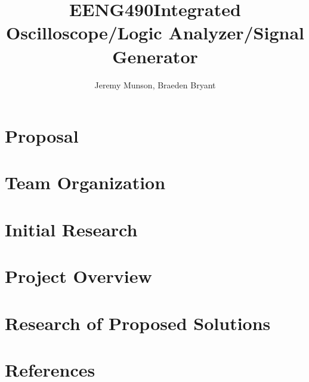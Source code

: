 \documentclass[11pt]{article}
\title{EENG490\linebreak \linebreak Integrated Oscilloscope/Logic Analyzer/Signal Generator}
\author{Jeremy Munson, Braeden Bryant}
\begin{document}
	
	
	
	

	\section{Proposal}
	
	
	
	
	
	
	

	\section{Team Organization}
	
	

	\section{Initial Research}
	
	

	\section{Project Overview}
	
	
	
	
	

	\section{Research of Proposed Solutions}
	
	
	
	
	
	
	
	
	
	\section{References}
\end{document}
